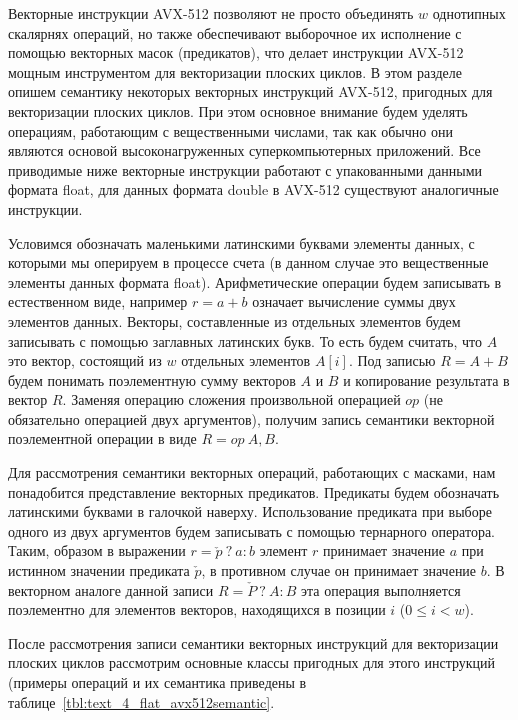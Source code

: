 Векторные инструкции AVX-512 позволяют не просто объединять $w$ однотипных скалярнях операций, но также обеспечивают выборочное их исполнение с помощью векторных масок (предикатов), что делает инструкции AVX-512 мощным инструментом для векторизации плоских циклов.
В этом разделе опишем семантику некоторых векторных инструкций AVX-512, пригодных для векторизации плоских циклов.
При этом основное внимание будем уделять операциям, работающим с вещественными числами, так как обычно они являются основой высоконагруженных суперкомпьютерных приложений.
Все приводимые ниже векторные инструкции работают с упакованными данными формата float, для данных формата double в AVX-512 существуют аналогичные инструкции.

Условимся обозначать маленькими латинскими буквами элементы данных, с которыми мы оперируем в процессе счета (в данном случае это вещественные элементы данных формата float).
Арифметические операции будем записывать в естественном виде, например $r = a + b$ означает вычисление суммы двух элементов данных.
Векторы, составленные из отдельных элементов будем записывать с помощью заглавных латинских букв.
То есть будем считать, что $A$ это вектор, состоящий из $w$ отдельных элементов $A[i]$.
Под записью $R = A + B$ будем понимать поэлементную сумму векторов $A$ и $B$ и копирование результата в вектор $R$.
Заменяя операцию сложения произвольной операцией $op$ (не обязательно операцией двух аргументов), получим запись семантики векторной поэлементной операции в виде $R = op \ A, B$.

Для рассмотрения семантики векторных операций, работающих с масками, нам понадобится представление векторных предикатов.
Предикаты будем обозначать латинскими буквами в галочкой наверху.
Использование предиката при выборе одного из двух аргументов будем записывать с помощью тернарного оператора.
Таким, образом в выражении $r = \check{p} \ ? \ a : b$ элемент $r$ принимает значение $a$ при истинном значении предиката $\check{p}$, в противном случае он принимает значение $b$.
В векторном аналоге данной записи $R = \check{P} \ ? \ A : B$ эта операция выполняется поэлементно для элементов векторов, находящихся в позиции $i$ ($0 \le i < w$).

После рассмотрения записи семантики векторных инструкций для векторизации плоских циклов рассмотрим основные классы пригодных для этого инструкций (примеры операций и их семантика приведены в таблице~\ref{tbl:text_4_flat_avx512semantic}.

